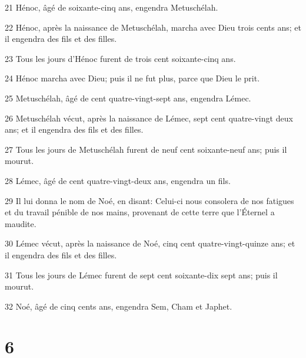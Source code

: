 \par 21 Hénoc, âgé de soixante-cinq ans, engendra Metuschélah.
\par 22 Hénoc, après la naissance de Metuschélah, marcha avec Dieu trois cents ans; et il engendra des fils et des filles.
\par 23 Tous les jours d'Hénoc furent de trois cent soixante-cinq ans.
\par 24 Hénoc marcha avec Dieu; puis il ne fut plus, parce que Dieu le prit.
\par 25 Metuschélah, âgé de cent quatre-vingt-sept ans, engendra Lémec.
\par 26 Metuschélah vécut, après la naissance de Lémec, sept cent quatre-vingt deux ans; et il engendra des fils et des filles.
\par 27 Tous les jours de Metuschélah furent de neuf cent soixante-neuf ans; puis il mourut.
\par 28 Lémec, âgé de cent quatre-vingt-deux ans, engendra un fils.
\par 29 Il lui donna le nom de Noé, en disant: Celui-ci nous consolera de nos fatigues et du travail pénible de nos mains, provenant de cette terre que l'Éternel a maudite.
\par 30 Lémec vécut, après la naissance de Noé, cinq cent quatre-vingt-quinze ans; et il engendra des fils et des filles.
\par 31 Tous les jours de Lémec furent de sept cent soixante-dix sept ans; puis il mourut.
\par 32 Noé, âgé de cinq cents ans, engendra Sem, Cham et Japhet.

\chapter{6}

